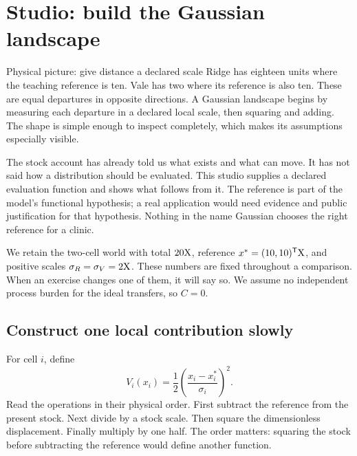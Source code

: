 \chapter{Studio: build the Gaussian landscape}\label{ch:studio-potential}

\begin{intuitionbox}{Physical picture: give distance a declared scale}
Ridge has eighteen units where the teaching reference is ten. Vale has two where its reference is also ten. These are equal departures in opposite directions. A Gaussian landscape begins by measuring each departure in a declared local scale, then squaring and adding. The shape is simple enough to inspect completely, which makes its assumptions especially visible.
\end{intuitionbox}

The stock account has already told us what exists and what can move. It has not said how a distribution should be evaluated. This studio supplies a declared evaluation function and shows what follows from it. The reference is part of the model's functional hypothesis; a real application would need evidence and public justification for that hypothesis. Nothing in the name Gaussian chooses the right reference for a clinic.

We retain the two-cell world with total \(20\mathrm{X}\), reference \(x^*=(10,10)^{\mathsf T}\mathrm{X}\), and positive scales \(\sigma_R=\sigma_V=2\mathrm{X}\). These numbers are fixed throughout a comparison. When an exercise changes one of them, it will say so. We assume no independent process burden for the ideal transfers, so \(C=0\).

\section{Construct one local contribution slowly}

For cell \(i\), define
\begin{equation}
V_i(x_i)=\frac12\left(\frac{x_i-x_i^*}{\sigma_i}\right)^2.
\end{equation}
Read the operations in their physical order. First subtract the reference from the present stock. Next divide by a stock scale. Then square the dimensionless displacement. Finally multiply by one half. The order matters: squaring the stock before subtracting the reference would define another function.


